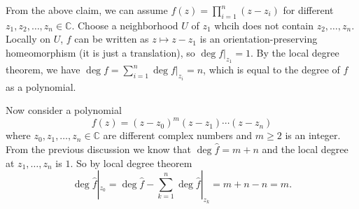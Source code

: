 \documentclass[a4paper, 12pt]{article}
\begin{document}
\begin{solution}
From the above claim, we can assume \(f(z)=\prod_{i=1}^n(z-z_i)\) for different \(z_1,z_2,\ldots,z_n\in \mathbb{C}\). Choose a neighborhood \(U\) of \(z_1\) whcih does not contain \(z_2,\ldots,z_n\). Locally on \(U\), \(f\) can be 
written as \(z\mapsto z-z_1\) is an orientation-preserving homeomorphism (it is just a translation), so \(\deg f|_{z_1}=1\). By the local degree theorem, we have \(\deg f=\sum_{i=1}^n \deg f|_{z_i}=n\), which is equal to the degree of \(f\) as a polynomial.

Now consider a polynomial 
\[f(z)=(z-z_0)^m(z-z_1)\cdots(z-z_n)\] 
where \(z_0,z_1,\ldots,z_n\in \mathbb{C}\) are different complex numbers and \(m\geq 2\) is an integer. From the previous discussion we know that \(\deg \hat{f}=m+n\) and the local degree at \(z_1,\ldots,z_n\) is \(1\). So by local degree theorem 
\[\deg \hat{f}|_{z_0}=\deg \hat{f}-\sum_{k=1}^{n} \deg \hat{f}|_{z_k}=m+n-n=m.\]
\end{solution}
\end{document}
